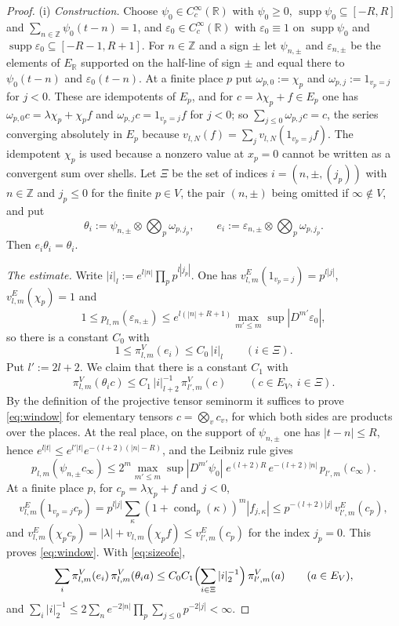 \documentclass[11pt]{amsart}
\theoremstyle{definition}
\theoremstyle{remark}
\newcommand{\R}{\mathbb R}
\newcommand{\Z}{\mathbb Z}
\newcommand{\supp}{\operatorname{supp}}
\newcommand{\cond}{\operatorname{cond}}
\begin{document}
\begin{proof}
(i) \emph{Construction.}  Choose $\psi_0\in C_c^{\infty}(\R)$ with
$\psi_0\ge0$, $\supp\psi_0\subseteq[-R,R]$ and $\sum_{n\in\Z}\psi_0(t-n)=1$,
and $\varepsilon_0\in C_c^{\infty}(\R)$ with $\varepsilon_0\equiv1$ on
$\supp\psi_0$ and $\supp\varepsilon_0\subseteq[-R-1,R+1]$.  For $n\in\Z$ and a
sign $\pm$ let $\psi_{n,\pm}$ and $\varepsilon_{n,\pm}$ be the elements of
$E_{\R}$ supported on the half-line of sign $\pm$ and equal there to
$\psi_0(t-n)$ and $\varepsilon_0(t-n)$.  At a finite place $p$ put
$\omega_{p,0}:=\chi_p$ and $\omega_{p,j}:=1_{v_p=j}$ for $j<0$.  These are
idempotents of $E_p$, and for $c=\lambda\chi_p+f\in E_p$ one has
$\omega_{p,0}c=\lambda\chi_p+\chi_pf$ and $\omega_{p,j}c=1_{v_p=j}f$ for $j<0$;
so $\sum_{j\le0}\omega_{p,j}c=c$, the series converging absolutely in $E_p$
because $v_{l,N}(f)=\sum_jv_{l,N}(1_{v_p=j}f)$.  The idempotent $\chi_p$ is
used because a nonzero value at $x_p=0$ cannot be written as a convergent sum
over shells.  Let $\Xi$ be the set of indices $i=(n,\pm,(j_p))$ with $n\in\Z$
and $j_p\le0$ for the finite $p\in V$, the pair $(n,\pm)$ being omitted if
$\infty\notin V$, and put
\[
\theta_i:=\psi_{n,\pm}\otimes\bigotimes_p\omega_{p,j_p},\qquad
e_i:=\varepsilon_{n,\pm}\otimes\bigotimes_p\omega_{p,j_p}.
\]
Then $e_i\theta_i=\theta_i$.

\emph{The estimate.}  Write $|i|_l:=e^{l|n|}\prod_pp^{l|j_p|}$.  One has
$v^{E}_{l,m}(1_{v_p=j})=p^{l|j|}$, $v^{E}_{l,m}(\chi_p)=1$ and
\[
1\le p_{l,m}(\varepsilon_{n,\pm})\le e^{l(|n|+R+1)}\max_{m'\le m}
\sup|D^{m'}\varepsilon_0| ,
\]
so there is a constant $C_0$ with
\begin{equation}\label{eq:sizeofe}
1\le\pi^{V}_{l,m}(e_i)\le C_0\,|i|_l\qquad(i\in\Xi).
\end{equation}
Put $l':=2l+2$.  We claim that there is a constant $C_1$ with
\begin{equation}\label{eq:window}
\pi^{V}_{l,m}(\theta_ic)\le C_1\,|i|_{l+2}^{-1}\,\pi^{V}_{l',m}(c)
\qquad(c\in E_V,\ i\in\Xi).
\end{equation}
By the definition of the projective tensor seminorm it suffices to prove
\eqref{eq:window} for elementary tensors $c=\bigotimes_vc_v$, for which both
sides are products over the places.  At the real place, on the support of
$\psi_{n,\pm}$ one has $|t-n|\le R$, hence
$e^{l|t|}\le e^{l'|t|}e^{-(l+2)(|n|-R)}$, and the Leibniz rule gives
\[
p_{l,m}(\psi_{n,\pm}c_{\infty})\le2^{m}\max_{m'\le m}\sup|D^{m'}\psi_0|\;
e^{(l+2)R}\,e^{-(l+2)|n|}\,p_{l',m}(c_{\infty}).
\]
At a finite place $p$, for $c_p=\lambda\chi_p+f$ and $j<0$,
\[
v^{E}_{l,m}(1_{v_p=j}c_p)=p^{l|j|}\sum_{\kappa}(1+\cond_p(\kappa))^{m}|f_{j,\kappa}|
\le p^{-(l+2)|j|}\,v^{E}_{l',m}(c_p),
\]
and $v^{E}_{l,m}(\chi_pc_p)=|\lambda|+v_{l,m}(\chi_pf)\le v^{E}_{l',m}(c_p)$ for
the index $j_p=0$.  This proves \eqref{eq:window}.  With \eqref{eq:sizeofe},
\begin{equation}\label{eq:summable}
\sum_i\pi^{V}_{l,m}(e_i)\,\pi^{V}_{l,m}(\theta_ia)\le
C_0C_1\Bigl(\sum_{i\in\Xi}|i|_2^{-1}\Bigr)\,\pi^{V}_{l',m}(a)\qquad(a\in E_V),
\end{equation}
and $\sum_i|i|_2^{-1}\le2\sum_ne^{-2|n|}\prod_p\sum_{j\le0}p^{-2|j|}<\infty$.


\end{proof}
\end{document}
